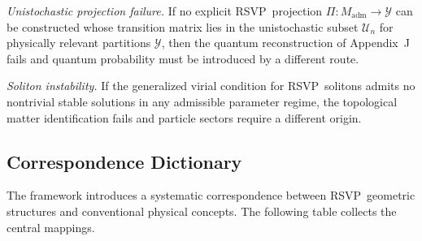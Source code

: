 \documentclass[12pt,a4paper]{article}
\newcommand{\RSVP}{\textrm{RSVP}}
\begin{document}
\textit{Unistochastic projection failure.} If no explicit \RSVP\ projection
$\Pi:M_\mathrm{adm}\to\mathcal{Y}$ can be constructed whose transition matrix
lies in the unistochastic subset $\mathcal{U}_n$ for physically relevant
partitions $\mathcal{Y}$, then the quantum reconstruction of Appendix~J fails
and quantum probability must be introduced by a different route.

\textit{Soliton instability.} If the generalized virial condition for \RSVP\
solitons admits no nontrivial stable solutions in any admissible parameter
regime, the topological matter identification fails and particle sectors require
a different origin.

\subsection{Correspondence Dictionary}

The framework introduces a systematic correspondence between \RSVP\ geometric
structures and conventional physical concepts. The following table collects the
central mappings.
\end{document}
